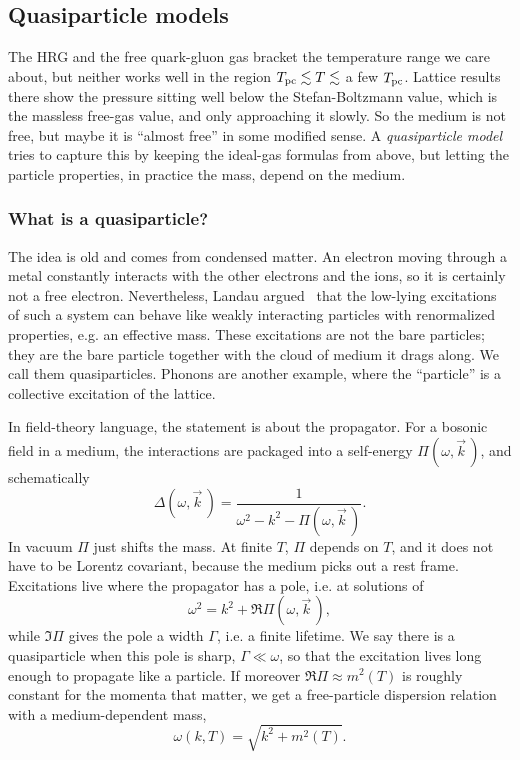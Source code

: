 \subsection{Quasiparticle models}\label{sec:quasiparticle}

The HRG and the free quark-gluon gas bracket the temperature range
we care about, but neither works well in the region
$T_{\rm pc}\lesssim T\lesssim$ a few $T_{\rm pc}$. Lattice results there show the
pressure sitting well below the Stefan-Boltzmann value, which is
the massless free-gas value, and only approaching it slowly.
So the medium is not free, but maybe it is ``almost free'' in some
modified sense. A {\it quasiparticle model} tries to capture this by
keeping the ideal-gas formulas from above, but letting the
particle properties, in practice the mass, depend on the medium.

\subsubsection{What is a quasiparticle?}

The idea is old and comes from condensed matter. An electron moving through
a metal constantly interacts with the other electrons and the ions, so it
is certainly not a free electron. Nevertheless, Landau
argued~\cite{landau_theory_1956} that the low-lying excitations of such a
system can behave like weakly interacting particles with renormalized
properties, e.g. an effective mass. These excitations are not the bare
particles; they are the bare particle together with the cloud of
medium it drags along. We call them quasiparticles. Phonons are another
example, where the ``particle'' is a collective excitation of the lattice.

In field-theory language, the statement is about the propagator. For a
bosonic field in a medium, the interactions are packaged into a
self-energy $\Pi(\omega,\vec{k}\,)$, and schematically
\begin{equation}
  \Delta(\omega,\vec{k}\,)=\frac{1}{\omega^2-k^2-\Pi(\omega,\vec{k}\,)}.
\end{equation}
In vacuum $\Pi$ just shifts the mass. At finite $T$, $\Pi$ depends on
$T$, and it does not have to be Lorentz covariant, because the medium picks
out a rest frame. Excitations live where the propagator has a pole, i.e. at
solutions of
\begin{equation}
  \omega^2=k^2+\Re\Pi(\omega,\vec{k}\,),
\end{equation}
while $\Im\Pi$ gives the pole a width $\Gamma$, i.e. a finite lifetime.
We say there is a quasiparticle when this pole is sharp,
$\Gamma\ll\omega$, so that the excitation lives long enough to propagate
like a particle. If moreover $\Re\Pi\approx m^2(T)$ is roughly constant
for the momenta that matter, we get a free-particle dispersion relation
with a medium-dependent mass,
\begin{equation}\label{eq:qpdispersion}
  \omega(k,T)=\sqrt{k^2+m^2(T)}.
\end{equation}

